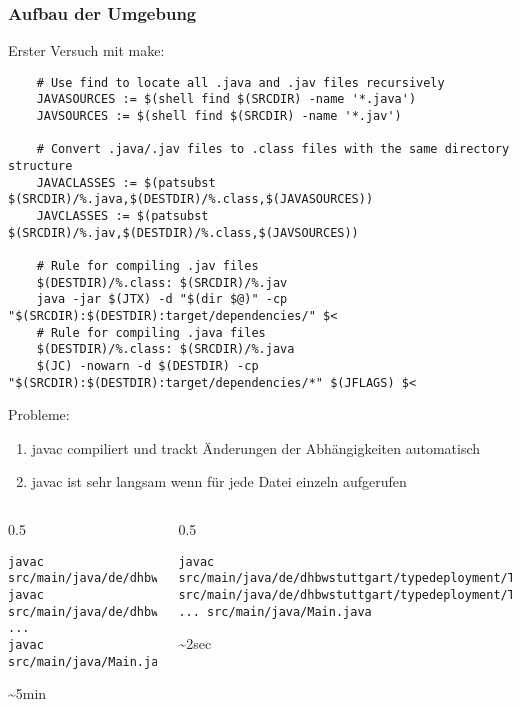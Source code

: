 \documentclass{beamer}
\begin{document}
\begin{frame}[fragile]
\frametitle{Aufbau der Umgebung}
Erster Versuch mit make:
\begin{lstlisting}
    # Use find to locate all .java and .jav files recursively
    JAVASOURCES := $(shell find $(SRCDIR) -name '*.java')
    JAVSOURCES := $(shell find $(SRCDIR) -name '*.jav')

    # Convert .java/.jav files to .class files with the same directory structure
    JAVACLASSES := $(patsubst $(SRCDIR)/%.java,$(DESTDIR)/%.class,$(JAVASOURCES))
    JAVCLASSES := $(patsubst $(SRCDIR)/%.jav,$(DESTDIR)/%.class,$(JAVSOURCES))

    # Rule for compiling .jav files
    $(DESTDIR)/%.class: $(SRCDIR)/%.jav
    java -jar $(JTX) -d "$(dir $@)" -cp "$(SRCDIR):$(DESTDIR):target/dependencies/" $<
    # Rule for compiling .java files
    $(DESTDIR)/%.class: $(SRCDIR)/%.java
	$(JC) -nowarn -d $(DESTDIR) -cp "$(SRCDIR):$(DESTDIR):target/dependencies/*" $(JFLAGS) $<
\end{lstlisting}
\end{frame}


\begin{frame}[fragile]
    Probleme:
    \begin{enumerate}
        \item javac compiliert und trackt Änderungen der Abhängigkeiten automatisch 
        \item javac ist sehr langsam wenn für jede Datei einzeln aufgerufen
    \end{enumerate}
        \begin{columns}
            \begin{column}{0.5\textwidth}
                \begin{lstlisting}
javac src/main/java/de/dhbwstuttgart/typedeployment/TypeInsert.java
javac src/main/java/de/dhbwstuttgart/typedeployment/TypeInsertPlacer.java
...
javac src/main/java/Main.java
                \end{lstlisting}
                \sim{}5min
            \end{column}
            \begin{column}{0.5\textwidth}
                \begin{lstlisting}
javac src/main/java/de/dhbwstuttgart/typedeployment/TypeInsert.java src/main/java/de/dhbwstuttgart/typedeployment/TypeInsertPlacer.java ... src/main/java/Main.java
                \end{lstlisting}
                \sim{}2sec
            \end{column}
        \end{columns}
\end{frame}
\end{document}
